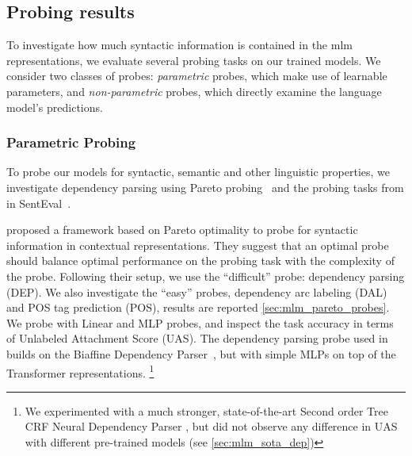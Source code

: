 \documentclass[letterpaper, 12pt]{report}
\begin{document}
\subsection{Probing results}
\label{sec:mlm_probing_results}

To investigate how much syntactic information is contained in the \acrshort{mlm} representations, we evaluate several probing tasks on our trained models. We consider two classes of probes: \textit{parametric} probes, which make use of learnable parameters, and \textit{non-parametric} probes, which directly examine the language model's predictions.

\subsubsection{Parametric Probing}
\label{sec:mlm_param_probing}

To probe our models for syntactic, semantic and other linguistic properties, we investigate dependency parsing using Pareto probing~\cite{pimentel-etal-2020-pareto} and the probing tasks from \cite{conneau-etal-2018-cram} in SentEval~\cite{conneau-kiela-2018-senteval}.

\citet{pimentel-etal-2020-pareto} proposed a framework based on Pareto optimality to probe for syntactic information in contextual representations. They suggest that an optimal probe should balance optimal performance on the probing task with the complexity of the probe. Following their setup, we use the ``difficult'' probe: dependency parsing (DEP). We also investigate the ``easy'' probes, dependency arc labeling (DAL) and POS tag prediction (POS), results are reported \autoref{sec:mlm_pareto_probes}.
We probe with Linear and MLP probes, and inspect the task accuracy in terms of Unlabeled Attachment Score (UAS).
The dependency parsing probe used in \citet{pimentel-etal-2020-pareto} builds on the Biaffine Dependency Parser~\citep{dozat2016deep}, but with simple MLPs on top of the Transformer representations.%
\footnote{We experimented with a much stronger, state-of-the-art Second order Tree CRF Neural Dependency Parser \cite{zhang-etal-2020-efficient}, but did not observe any difference in UAS with different pre-trained models (see \autoref{sec:mlm_sota_dep})}
\end{document}
